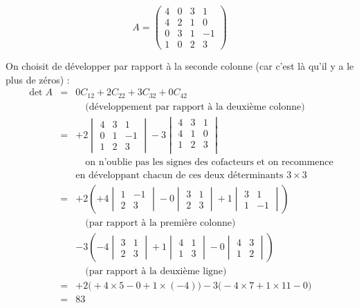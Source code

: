 \documentclass[class=report,crop=false]{standalone}
\begin{document}
\begin{exemple}
$$A = \begin{pmatrix}
4 & 0 & 3 & 1\\
4 & 2 & 1 & 0\\
0 & 3 & 1 & -1\\
1 & 0 & 2 & 3
\end{pmatrix}
$$

On choisit de développer par rapport à la seconde colonne
(car c'est là qu'il y a le plus de zéros) :
$$\begin{array}{rcl}
\det A
  & = & 0 C_{12} + 2 C_{22} + 3 C_{32}+0 C_{42}\\[5pt]
   && \quad\text{(développement par rapport à la deuxième colonne)} \\[5pt]
  & = & +2 \begin{vmatrix}4&3&1\\0&1&-1\\1&2&3 \end{vmatrix}
        -3 \begin{vmatrix}4&3&1\\4&1&0\\1&2&3\\ \end{vmatrix} \\[5pt]
       && \quad \text{on n'oublie pas les signes des cofacteurs et on recommence} \\[5pt]
  & & \text{en développant chacun de ces deux déterminants $3\times 3$} \\[5pt]
  & = & +2 \left(+4\begin{vmatrix}1&-1\\2&3\end{vmatrix}-0\begin{vmatrix}3&1\\2&3\end{vmatrix}
  +1\begin{vmatrix}3&1\\1&-1\end{vmatrix}\right)\\[5pt]
  &&\quad \text{(par rapport à la première colonne)}\\[5pt]
  &   & -3\left(-4\begin{vmatrix}3&1\\2&3\end{vmatrix}+1\begin{vmatrix}4&1\\1&3\end{vmatrix}
  -0\begin{vmatrix}4&3\\1&2\end{vmatrix}\right) \\[5pt]
  &&\quad\text{(par rapport à la deuxième ligne)}\\[5pt]
 & = & +2 \big(+4\times 5-0 +1\times(-4)\big)
 		-3\big(-4\times7 +1\times11 - 0 \big)\\[5pt]
  & = & 83\\
\end{array}$$


\end{exemple}
\end{document}
